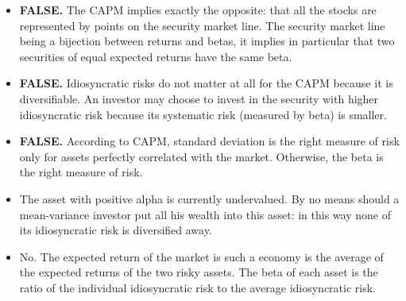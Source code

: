 \documentclass[10pt]{article}
\newenvironment{exercise}[2][Exercise]{\begin{trivlist}
  \item[\hskip \labelsep {\bfseries #1}\hskip \labelsep {\bfseries #2.}]}{\end{trivlist}}
\begin{document}
\begin{exercise}{3}
  \begin{itemize}{(a)}
    \item
      \textbf{FALSE.} The CAPM implies exactly the opposite: that all the stocks
      are represented by points on the security market line. The security market
      line being a bijection between returns and betas, it implies in particular
      that two securities of equal expected returns have the same beta.
    \item
      \textbf{FALSE.} Idiosyncratic risks do not matter at all for the CAPM
      because it is diversifiable. An investor may choose to invest in the
      security with higher idiosyncratic risk because its systematic risk
      (measured by beta) is smaller.

    \item
      \textbf{FALSE.} According to CAPM, standard deviation is the right measure
      of risk only for assets perfectly correlated with the market. Otherwise,
      the beta is the right measure of risk.
    \item
      The asset with positive alpha is currently undervalued. By no means should
      a mean-variance investor put all his wealth into this asset: in this way
      none of its idiosyncratic risk is diversified away.
      \item
        No. The expected return of the market is such a economy is the average
        of the expected returns of the two risky assets. The beta of each asset
        is the ratio of the individual idiosyncratic risk to the average
        idiosyncratic risk. 
  \end{itemize}
\end{exercise}

\newpage
\end{document}

